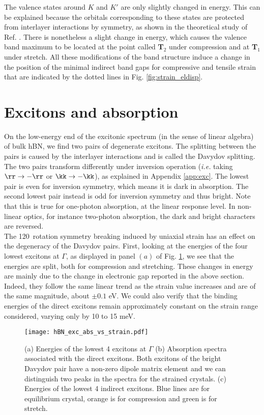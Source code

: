 The valence states around $K$ and $K'$ are only slightly changed in energy. This can be explained because the orbitals corresponding to these states are protected from interlayer interactions by symmetry, as shown in the theoretical study of Ref. \cite{kang2016unified}. There is nonetheless a slight change in energy, which causes the valence band maximum to be located at the point called \textbf{T}$_2$ under compression and at \textbf{T}$_1$ under stretch. 
All these modifications of the band structure induce a change in the position of the minimal indirect band gaps for compressive and tensile strain that are indicated by the dotted lines in Fig. \ref{fig:strain_eldisp}.


%
\section{Excitons and absorption}
On the low-energy end of the excitonic spectrum (in the sense of linear algebra) of bulk \acrshort{hBN}, we find two pairs of degenerate excitons. The splitting between the pairs is caused by the interlayer interactions and is called the Davydov splitting.\cite{paleari2018excitons} The two pairs transform differently under inversion operation (\textit{i.e.} taking $\rr \to -\rr$ or $\kk \to -\kk$), as explained in Appendix \ref{app:exc}. The lowest pair is even for inversion symmetry, which means it is dark in absorption. The second lowest pair instead is odd for inversion symmetry and thus bright.
Note that this is true for one-photon absorption, at the linear response level. In non-linear optics, for instance two-photon absorption, the dark and bright characters are reversed.\cite{attaccalite2018two} \\
The 120\textdegree~rotation symmetry breaking induced by uniaxial strain has an effect on the degeneracy of the Davydov pairs. First, looking at the energies of the four lowest excitons at $\Gamma$, as displayed in panel $(a)$ of Fig. \ref{fig:exc_abs_vs_strain}, we see that the energies are split, both for compression and stretching. 
These changes in energy are mainly due to the change in electronic gap reported in the above section. Indeed, they follow the same linear trend as the strain value increases and are of the same magnitude, about $\pm 0.1$ eV. We could also verify that the binding energies of the direct excitons remain approximately constant on the strain range considered, varying only by 10 to 15 meV.
\begin{figure}[tbp]
	\vspace{0.2cm}
	\setcapindent{2em}
	\centering
	\texttt{[image: hBN\_exc\_abs\_vs\_strain.pdf]}
	\caption{(a) Energies of the lowest 4 excitons at $\Gamma$ (b) Absorption spectra associated with the direct excitons. Both excitons of the bright Davydov pair have a non-zero dipole matrix element and we can distinguish two peaks in the spectra for the strained crystals. (c) Energies of the lowest 4 indirect excitons. Blue lines are for equilibrium crystal, orange is for compression and green is for stretch. }
	\label{fig:exc_abs_vs_strain}
\end{figure}

